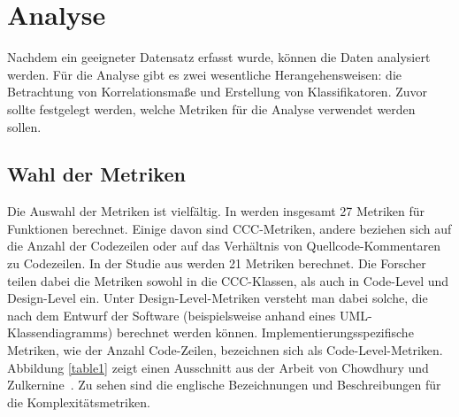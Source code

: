 \section{Analyse}
\label{sec:analyse}
Nachdem ein geeigneter Datensatz erfasst wurde, können die Daten analysiert werden.
Für die Analyse gibt es zwei wesentliche Herangehensweisen: die Betrachtung von Korrelationsmaße und Erstellung von Klassifikatoren.
Zuvor sollte festgelegt werden, welche Metriken für die Analyse verwendet werden sollen.

\subsection{Wahl der Metriken}
Die Auswahl der Metriken ist vielfältig.
In \cite{alves_et_al} werden insgesamt 27 Metriken für Funktionen berechnet.
Einige davon sind CCC-Metriken, andere beziehen sich auf die Anzahl der Codezeilen oder auf das Verhältnis von Quellcode-Kommentaren zu Codezeilen.
In der Studie aus \cite{chowdhury_zulkernine_2009} werden 21 Metriken berechnet.
Die Forscher teilen dabei die Metriken sowohl in die CCC-Klassen, als auch in Code-Level und Design-Level ein.
Unter Design-Level-Metriken versteht man dabei solche, die nach dem Entwurf der Software (beispielsweise anhand eines UML-Klassendiagramms) berechnet werden können.
Implementierungsspezifische Metriken, wie der Anzahl Code-Zeilen, bezeichnen sich als Code-Level-Metriken.
Abbildung \ref{table1} zeigt einen Ausschnitt aus der Arbeit von Chowdhury und Zulkernine~\cite{chowdhury_zulkernine_2010}.
Zu sehen sind die englische Bezeichnungen und Beschreibungen für die Komplexitätsmetriken.


